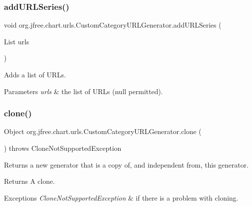 \subsubsection{\texorpdfstring{add\+U\+R\+L\+Series()}{addURLSeries()}}
{\footnotesize\ttfamily void org.\+jfree.\+chart.\+urls.\+Custom\+Category\+U\+R\+L\+Generator.\+add\+U\+R\+L\+Series (\begin{DoxyParamCaption}\item[{List}]{urls }\end{DoxyParamCaption})}

Adds a list of U\+R\+Ls.


\begin{DoxyParams}{Parameters}
{\em urls} & the list of U\+R\+Ls ({\ttfamily null} permitted). \\
\hline
\end{DoxyParams}
\mbox{\label{classorg_1_1jfree_1_1chart_1_1urls_1_1_custom_category_u_r_l_generator_a9c3094c5d52b61920ea2721f44e71fac}} 
\subsubsection{\texorpdfstring{clone()}{clone()}}
{\footnotesize\ttfamily Object org.\+jfree.\+chart.\+urls.\+Custom\+Category\+U\+R\+L\+Generator.\+clone (\begin{DoxyParamCaption}{ }\end{DoxyParamCaption}) throws Clone\+Not\+Supported\+Exception}

Returns a new generator that is a copy of, and independent from, this generator.

\begin{DoxyReturn}{Returns}
A clone.
\end{DoxyReturn}

\begin{DoxyExceptions}{Exceptions}
{\em Clone\+Not\+Supported\+Exception} & if there is a problem with cloning. \\
\hline
\end{DoxyExceptions}
\mbox{\label{classorg_1_1jfree_1_1chart_1_1urls_1_1_custom_category_u_r_l_generator_ac40ff1f3446f2ce1b1ba5de491841da8}} 
